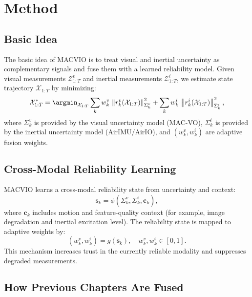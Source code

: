 \section{Method}
\label{sec:macvio:method}

\subsection{Basic Idea}

The basic idea of MACVIO is to treat visual and inertial uncertainty as complementary signals and fuse them with a learned reliability model.
Given visual measurements $\mathcal{Z}_{1:T}^{v}$ and inertial measurements $\mathcal{Z}_{1:T}^{i}$, we estimate state trajectory $\mathcal{X}_{1:T}$ by minimizing:
\begin{equation}
\label{eq:macvio:objective}
\mathcal{X}_{1:T}^{*}
=
\argmin_{\mathcal{X}_{1:T}}
\sum_{k} w_k^{v}\, \left\| r_k^{v}(\mathcal{X}_{1:T}) \right\|_{{\Sigma}_k^{v}}^2
+
\sum_{k} w_k^{i}\, \left\| r_k^{i}(\mathcal{X}_{1:T}) \right\|_{{\Sigma}_k^{i}}^2 ,
\end{equation}
where ${\Sigma}_k^{v}$ is provided by the visual uncertainty model (MAC-VO), ${\Sigma}_k^{i}$ is provided by the inertial uncertainty model (AirIMU/AirIO), and $(w_k^{v}, w_k^{i})$ are adaptive fusion weights.

\subsection{Cross-Modal Reliability Learning}

MACVIO learns a cross-modal reliability state from uncertainty and context:
\begin{equation}
\label{eq:macvio:state}
\mathbf{s}_k = \phi\!\left({\Sigma}_k^{v}, {\Sigma}_k^{i}, \mathbf{c}_k\right),
\end{equation}
where $\mathbf{c}_k$ includes motion and feature-quality context (for example, image degradation and inertial excitation level).
The reliability state is mapped to adaptive weights by:
\begin{equation}
\label{eq:macvio:weights}
\left(w_k^{v}, w_k^{i}\right) = g(\mathbf{s}_k), \quad w_k^{v}, w_k^{i}\in[0,1].
\end{equation}
This mechanism increases trust in the currently reliable modality and suppresses degraded measurements.

\subsection{How Previous Chapters Are Fused}

